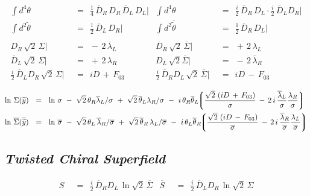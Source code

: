 \documentclass[14pt]{article}
\newcommand{\wt}{\widetilde}
\newcommand{\ov}{\overline}
\newcommand{\lgr}{\left\lgroup}
\newcommand{\rgr}{\right\rgroup}
\begin{document}
\begin{align*}
	\int d^4\theta & ~~=~~ \frac{1}{4}\, \ov D{}_R\, D_R\, \ov D{}_L\, D_L \Big|
	&
	\int d^4\theta & ~~=~~ \frac{i}{2}\, \ov D{}_R\, D_L \cdot \frac{i}{2}\, \ov D{}_L D_R \Big|
	\\
	\int d^2\wt\theta & ~~=~~ \frac{1}{2}\, \ov D{}_L\, D_R \Big|
	&
	\int d^2\ov{\wt\theta} & ~~=~~ \frac{1}{2}\, \ov D{}_R\, D_L \Big|
	\\ \\
	D_R\, \sqrt{2}\, \Sigma \Big| & ~~=~~ -\, 2\, \ov\lambda{}_L
	&
	\ov D{}_R\, \sqrt{2}\, \ov\Sigma \Big| & ~~=~~ +\, 2\, \lambda_L
	\\
	\ov D{}_L\, \sqrt{2}\, \Sigma \Big| & ~~=~~ +\, 2\, \lambda_R
	&
	D_L\, \sqrt{2} \ov\Sigma \Big| & ~~=~~ -\, 2\, \ov\lambda{}_R
	\\
	\frac{i}{2}\, \ov D{}_L D_R\, \sqrt{2}\, \Sigma \Big| & ~~=~~ iD \,+\, F_{03}
	&
	\frac{i}{2}\, \ov D{}_R D_L\, \sqrt{2}\, \ov\Sigma \Big| & ~~=~~ iD \,-\, F_{03}
\end{align*}

\begin{align*}
	\ln\, \Sigma(\wt y) & ~~=~~ \ln\,\sigma 
				~-~ \sqrt{2}\, \theta_R \ov\lambda{}_L / \sigma
				~+~ \sqrt{2}\, \ov\theta{}_L \lambda_R / \sigma
				~-~ i\, \theta_R \ov\theta{}_L \!\!
				    \lgr
					\frac{ \sqrt{2}\, \left( iD \,+\, F_{03} \right) }{ \sigma }
					\,-\,
					2\,i\, \frac{\ov\lambda{}_L}{\sigma} \frac{\lambda_R}{\sigma}
				    \rgr
	\\
	\ln\, \ov\Sigma(\ov{\wt y}) & ~~=~~ \ln\,\ov\sigma 
				~-~ \sqrt{2}\, \theta_L\, \ov\lambda{}_R / {\ov \sigma}
				~+~ \sqrt{2}\, \ov\theta{}_R\, \lambda_L / {\ov \sigma}
				~-~ i\, \theta_L \ov\theta{}_R \!\!
				    \lgr
					\frac{ \sqrt{2}\, \left( iD \,-\, F_{03} \right) }{ \ov\sigma }
					\,-\,
					2\,i\, \frac{\ov \lambda{}_R}{\ov\sigma} \frac{\lambda_L}{\ov\sigma}
				    \rgr
\end{align*}


\pagebreak
\subsection*{\centering \it Twisted Chiral Superfield }

\begin{align*}
%
	S &    ~~=~~    \frac{i}{2}\, \ov D{}_R D_L\, \ln \sqrt{2}\, \ov\Sigma
	&
	\ov S &    ~~=~~    \frac{i}{2}\, \ov D{}_L D_R\, \ln \sqrt{2}\, \Sigma
\end{align*}
\end{document}
